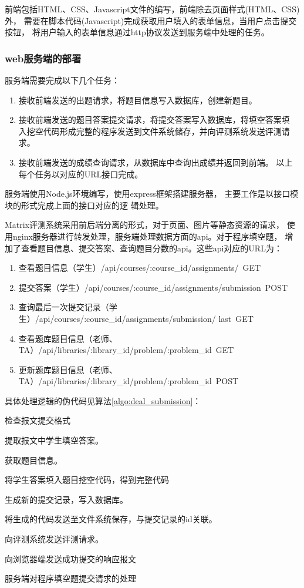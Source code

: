 前端包括HTML、CSS、Javascript文件的编写，前端除去页面样式(HTML、CSS)外，
需要在脚本代码(Javascript)完成获取用户填入的表单信息，当用户点击提交按钮，
将用户输入的表单信息通过http协议发送到服务端中处理的任务。

\subsubsection{web服务端的部署}
服务端需要完成以下几个任务：
\begin{enumerate}
  \item 接收前端发送的出题请求，将题目信息写入数据库，创建新题目。
  \item 接收前端发送的题目答案提交请求，将提交答案写入数据库，将填空答案填
入挖空代码形成完整的程序发送到文件系统储存，并向评测系统发送评测请求。
  \item 接收前端发送的成绩查询请求，从数据库中查询出成绩并返回到前端。
以上每个任务以对应的URL接口完成。
\end{enumerate}

服务端使用Node.js环境编写，使用express框架搭建服务器，
主要工作是以接口模块的形式完成上面的接口对应的逻
辑处理。

Matrix评测系统采用前后端分离的形式，对于页面、图片等静态资源的请求，
使用nginx服务器进行转发处理，服务端处理数据方面的api。对于程序填空题，
增加了查看题目信息、提交答案、查询题目分数的api。这些api对应的URL为：

\begin{enumerate}
  \item 查看题目信息（学生）/api/courses/:course\_id/assignments/\ GET
  \item 提交答案（学生）/api/courses/:course\_id/assignments/submission\ POST
  \item 查询最后一次提交记录（学生）/api/courses/:course\_id/assignments/submission/
  last\ GET
  \item 查看题库题目信息（老师、TA）/api/libraries/:library\_id/problem/:problem\_id\ GET
  \item 更新题库题目信息（老师、TA）/api/libraries/:library\_id/problem/:problem\_id\ POST
\end{enumerate}



具体处理逻辑的伪代码见算法\ref{algo:deal_submission}：

\begin{algorithm}[H]
  检查报文提交格式
   {
    提取报文中学生填空答案。

    获取题目信息。

    将学生答案填入题目挖空代码，得到完整代码

    生成新的提交记录，写入数据库。

    将生成的代码发送至文件系统保存，与提交记录的id关联。

    向评测系统发送评测请求。

    向浏览器端发送成功提交的响应报文
  } 
\caption{服务端对程序填空题提交请求的处理}
\label{algo:deal_submission}
\end{algorithm}

